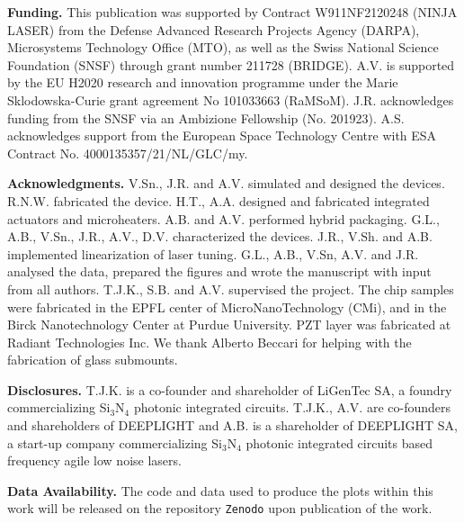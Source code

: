 \documentclass[9pt,twocolumn,twoside, superscriptaddress]{revtex4-2}
\begin{document}
\begin{footnotesize}
	
\noindent \textbf{Funding.} This publication was supported by Contract W911NF2120248 (NINJA LASER) from the Defense Advanced Research Projects Agency (DARPA), Microsystems Technology Office (MTO), as well as the Swiss National Science Foundation (SNSF) through grant number 211728 (BRIDGE). 
A.V. is supported by the EU H2020 research and innovation programme under the Marie Sklodowska-Curie grant agreement No 101033663 (RaMSoM).
J.R. acknowledges funding from the SNSF via an Ambizione Fellowship (No. 201923). 
A.S. acknowledges support from the European Space Technology Centre with ESA Contract No. 4000135357/21/NL/GLC/my.

\noindent \textbf{Acknowledgments.} V.Sn., J.R. and A.V. simulated and designed the devices.
R.N.W. fabricated the device. 
H.T., A.A. designed and fabricated integrated actuators and microheaters.
A.B. and A.V. performed hybrid packaging.
G.L., A.B., V.Sn., J.R., A.V., D.V. characterized the devices. 
J.R., V.Sh. and A.B. implemented linearization of laser tuning.
G.L., A.B., V.Sn, A.V. and J.R. analysed the data, prepared the figures and wrote the manuscript with input from all authors. 
T.J.K., S.B. and A.V. supervised the project.
The chip samples were fabricated in the EPFL center of MicroNanoTechnology (CMi), and in the Birck Nanotechnology Center at Purdue University. PZT layer was fabricated at Radiant Technologies Inc.
We thank Alberto Beccari for helping with the fabrication of glass submounts.

\noindent \textbf{Disclosures.} T.J.K. is a co-founder and shareholder of LiGenTec SA, a foundry commercializing Si$_3$N$_4$ photonic integrated circuits. T.J.K., A.V. are co-founders and shareholders of DEEPLIGHT and A.B. is a shareholder of DEEPLIGHT SA, a start-up company commercializing Si$_3$N$_4$ photonic integrated circuits based frequency agile low noise lasers.

\noindent \textbf{Data Availability.} The code and data used to produce the plots within this work will be released on the repository \texttt{Zenodo} upon publication of the work.

\end{footnotesize}


%



\end{document}
